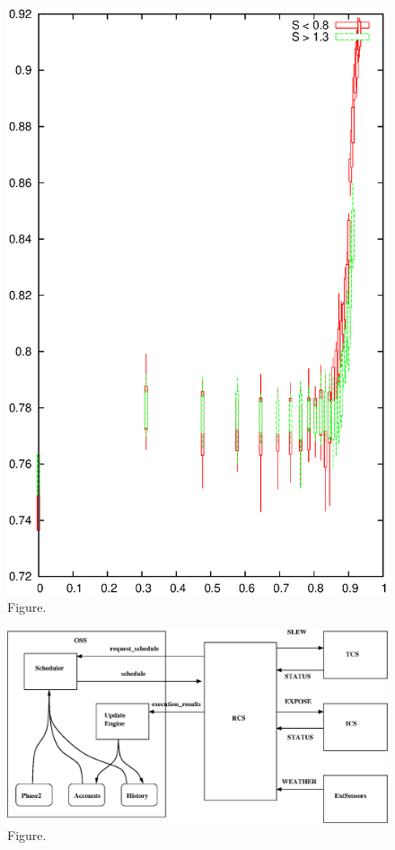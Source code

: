 \documentclass[12pt,a4paper]{article}
\begin{document}
\begin{figure}[htbp]
 \begin{center}
  \includegraphics[scale=1.0, angle=0]{figures/oh2.eps}
 \end{center}
  \caption[Figure.]
{Figure.}
\end{figure}
\clearpage
\begin{figure}[htbp]
 \begin{center}
  \includegraphics[scale=1.0, angle=0]{figures/overview_architecture.eps}
 \end{center}
  \caption[Figure.]
{Figure.}
\end{figure}
\end{document}
